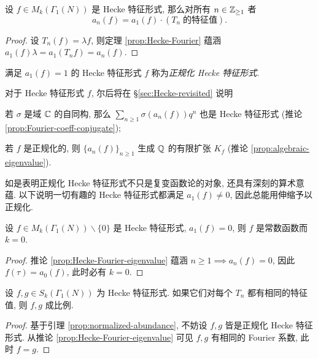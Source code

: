 \begin{corollary}\label{prop:Hecke-Fourier-eigenvalue}
	设 $f \in M_k(\Gamma_1(N))$ 是 Hecke 特征形式, 那么对所有 $n \in \mathbb{Z}_{\geq 1}$ 者
	\[ a_n(f) = a_1(f) \cdot (T_n\; \text{的特征值}). \]
\end{corollary}
\begin{proof}
	设 $T_n(f) = \lambda f$, 则定理 \ref{prop:Hecke-Fourier} 蕴涵 $a_1(f) \lambda = a_1(T_n f) = a_n(f)$.
\end{proof}

\begin{definition}\label{def:normalized-eigenform} 
	满足 $a_1(f)=1$ 的 Hecke 特征形式 $f$ 称为\emph{正规化 Hecke 特征形式}.
\end{definition}

对于 Hecke 特征形式 $f$, 尔后将在 \S\ref{sec:Hecke-revisited} 说明
\begin{compactitem}
	\item 若 $\sigma$ 是域 $\mathbb{C}$ 的自同构, 那么 $\sum_{n \geq 1} \sigma(a_n(f)) q^n$ 也是 Hecke 特征形式 (推论 \ref{prop:Fourier-coeff-conjugate});
	\item 若 $f$ 是正规化的, 则 $\{a_n(f)\}_{n \geq 1}$ 生成 $\mathbb{Q}$ 的有限扩张 $K_f$ (推论 \ref{prop:algebraic-eigenvalue}). 
\end{compactitem}
如是表明正规化 Hecke 特征形式不只是复变函数论的对象, 还具有深刻的算术意蕴. 以下说明一切有趣的 Hecke 特征形式都满足 $a_1(f) \neq 0$, 因此总能用伸缩予以正规化.

\begin{lemma}\label{prop:normalized-abundance}
	设 $f \in M_k(\Gamma_1(N)) \smallsetminus \{0\}$ 是 Hecke 特征形式, $a_1(f) = 0$, 则 $f$ 是常数函数而 $k = 0$.
\end{lemma}
\begin{proof}
	推论 \ref{prop:Hecke-Fourier-eigenvalue} 蕴涵 $n \geq 1 \implies a_n(f) = 0$, 因此 $f(\tau) = a_0(f)$, 此时必有 $k = 0$.
\end{proof}

\begin{proposition}\label{prop:normalized-mult1}
	设 $f, g \in S_k(\Gamma_1(N))$ 为 Hecke 特征形式. 如果它们对每个 $T_n$ 都有相同的特征值, 则 $f, g$ 成比例.
\end{proposition}
\begin{proof}
	基于引理 \ref{prop:normalized-abundance}, 不妨设 $f,g$ 皆是正规化 Hecke 特征形式. 从推论 \ref{prop:Hecke-Fourier-eigenvalue} 可见 $f,g$ 有相同的 Fourier 系数, 此时 $f=g$.
\end{proof}

